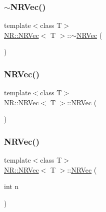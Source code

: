 \mbox{\label{classNR_1_1NRVec_a7161dfe4a95a73eca56d084c662f8eae}} 
\subsubsection{\texorpdfstring{$\sim$NRVec()}{~NRVec()}\hspace{0.1cm}{\footnotesize\ttfamily [2/3]}}
{\footnotesize\ttfamily template$<$class T$>$ \\
\mbox{\hyperlink{classNR_1_1NRVec}{N\+R\+::\+N\+R\+Vec}}$<$ T $>$\+::$\sim$\mbox{\hyperlink{classNR_1_1NRVec}{N\+R\+Vec}} (\begin{DoxyParamCaption}{ }\end{DoxyParamCaption})}

\mbox{\label{classNR_1_1NRVec_a3c549533b11738d9c1320abd0078f5aa}} 
\subsubsection{\texorpdfstring{NRVec()}{NRVec()}\hspace{0.1cm}{\footnotesize\ttfamily [11/15]}}
{\footnotesize\ttfamily template$<$class T$>$ \\
\mbox{\hyperlink{classNR_1_1NRVec}{N\+R\+::\+N\+R\+Vec}}$<$ T $>$\+::\mbox{\hyperlink{classNR_1_1NRVec}{N\+R\+Vec}} (\begin{DoxyParamCaption}{ }\end{DoxyParamCaption})}

\mbox{\label{classNR_1_1NRVec_a32e1c3a7b161ae48f90e95f44261c385}} 
\subsubsection{\texorpdfstring{NRVec()}{NRVec()}\hspace{0.1cm}{\footnotesize\ttfamily [12/15]}}
{\footnotesize\ttfamily template$<$class T$>$ \\
\mbox{\hyperlink{classNR_1_1NRVec}{N\+R\+::\+N\+R\+Vec}}$<$ T $>$\+::\mbox{\hyperlink{classNR_1_1NRVec}{N\+R\+Vec}} (\begin{DoxyParamCaption}\item[{int}]{n }\end{DoxyParamCaption})\hspace{0.3cm}{\ttfamily [explicit]}}

